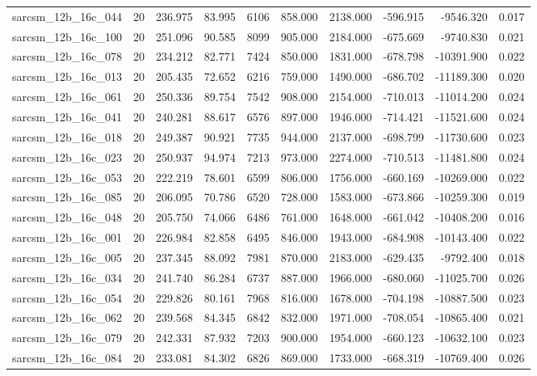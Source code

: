 \begin{tabular}{lrrrrrrrrr}
sarcsm\_12b\_16c\_044 & 20 & 236.975 & 83.995 & 6106 & 858.000 & 2138.000 & -596.915 & -9546.320 & 0.017 \\
sarcsm\_12b\_16c\_100 & 20 & 251.096 & 90.585 & 8099 & 905.000 & 2184.000 & -675.669 & -9740.830 & 0.021 \\
sarcsm\_12b\_16c\_078 & 20 & 234.212 & 82.771 & 7424 & 850.000 & 1831.000 & -678.798 & -10391.900 & 0.022 \\
sarcsm\_12b\_16c\_013 & 20 & 205.435 & 72.652 & 6216 & 759.000 & 1490.000 & -686.702 & -11189.300 & 0.020 \\
sarcsm\_12b\_16c\_061 & 20 & 250.336 & 89.754 & 7542 & 908.000 & 2154.000 & -710.013 & -11014.200 & 0.024 \\
sarcsm\_12b\_16c\_041 & 20 & 240.281 & 88.617 & 6576 & 897.000 & 1946.000 & -714.421 & -11521.600 & 0.024 \\
sarcsm\_12b\_16c\_018 & 20 & 249.387 & 90.921 & 7735 & 944.000 & 2137.000 & -698.799 & -11730.600 & 0.023 \\
sarcsm\_12b\_16c\_023 & 20 & 250.937 & 94.974 & 7213 & 973.000 & 2274.000 & -710.513 & -11481.800 & 0.024 \\
sarcsm\_12b\_16c\_053 & 20 & 222.219 & 78.601 & 6599 & 806.000 & 1756.000 & -660.169 & -10269.000 & 0.022 \\
sarcsm\_12b\_16c\_085 & 20 & 206.095 & 70.786 & 6520 & 728.000 & 1583.000 & -673.866 & -10259.300 & 0.019 \\
sarcsm\_12b\_16c\_048 & 20 & 205.750 & 74.066 & 6486 & 761.000 & 1648.000 & -661.042 & -10408.200 & 0.016 \\
sarcsm\_12b\_16c\_001 & 20 & 226.984 & 82.858 & 6495 & 846.000 & 1943.000 & -684.908 & -10143.400 & 0.022 \\
sarcsm\_12b\_16c\_005 & 20 & 237.345 & 88.092 & 7981 & 870.000 & 2183.000 & -629.435 & -9792.400 & 0.018 \\
sarcsm\_12b\_16c\_034 & 20 & 241.740 & 86.284 & 6737 & 887.000 & 1966.000 & -680.060 & -11025.700 & 0.026 \\
sarcsm\_12b\_16c\_054 & 20 & 229.826 & 80.161 & 7968 & 816.000 & 1678.000 & -704.198 & -10887.500 & 0.023 \\
sarcsm\_12b\_16c\_062 & 20 & 239.568 & 84.345 & 6842 & 832.000 & 1971.000 & -708.054 & -10865.400 & 0.021 \\
sarcsm\_12b\_16c\_079 & 20 & 242.331 & 87.932 & 7203 & 900.000 & 1954.000 & -660.123 & -10632.100 & 0.023 \\
sarcsm\_12b\_16c\_084 & 20 & 233.081 & 84.302 & 6826 & 869.000 & 1733.000 & -668.319 & -10769.400 & 0.026 \\

\end{tabular}
